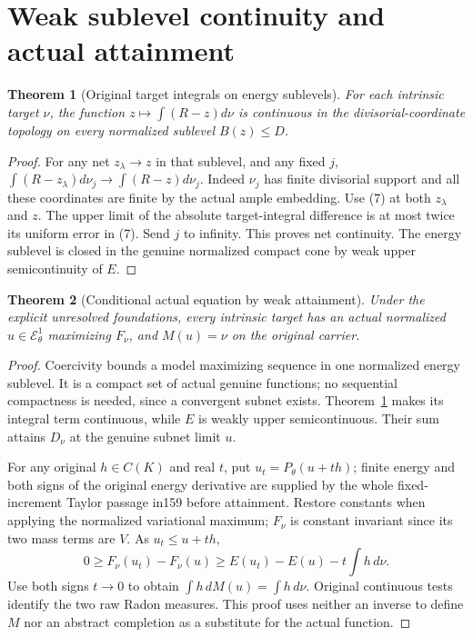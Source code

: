 \documentclass[11pt]{article}
\newtheorem{theorem}{Theorem}
\newcommand{\EE}{\mathcal E^1_\theta}
\begin{document}
\section{Weak sublevel continuity and actual attainment}
\begin{theorem}[Original target integrals on energy sublevels]\label{weak}
For each intrinsic target $\nu$, the function
$z\mapsto\int(R-z)d\nu$ is continuous in the divisorial-coordinate
topology on every normalized sublevel $B(z)\leq D$.
\end{theorem}
\begin{proof}
For any net $z_\lambda\to z$ in that sublevel, and any fixed $j$,
$\int(R-z_\lambda)d\nu_j\to\int(R-z)d\nu_j$.
Indeed $\nu_j$ has finite divisorial support and all these
coordinates are finite by the actual ample embedding.
Use (7) at both $z_\lambda$ and $z$.
The upper limit of the absolute target-integral difference
is at most twice its uniform error in (7).
Send $j$ to infinity. This proves net continuity.
The energy sublevel is closed in the genuine normalized compact
cone by weak upper semicontinuity of $E$.
\end{proof}

\begin{theorem}[Conditional actual equation by weak attainment]
Under the explicit unresolved foundations, every intrinsic target
has an actual normalized $u\in\EE$ maximizing $F_\nu$, and
$M(u)=\nu$ on the original carrier.
\end{theorem}
\begin{proof}
Coercivity bounds a model maximizing sequence in one normalized
energy sublevel. It is a compact set of actual genuine functions;
no sequential compactness is needed, since a convergent subnet exists.
Theorem~\ref{weak} makes its integral term continuous, while
$E$ is weakly upper semicontinuous.
Their sum attains $D_\nu$ at the genuine subnet limit $u$.

For any original $h\in C(K)$ and real $t$, put
$u_t=P_\theta(u+th)$; finite energy and both signs of the original
energy derivative are supplied by the whole fixed-increment
Taylor passage in159 before attainment.
Restore constants when applying the normalized variational maximum;
$F_\nu$ is constant invariant since its two mass terms are $V$.
As $u_t\leq u+th$,
\[
 0\geq F_\nu(u_t)-F_\nu(u)
 \geq E(u_t)-E(u)-t\int h\,d\nu .
\]
Use both signs $t\to0$ to obtain
$\int h\,dM(u)=\int h\,d\nu$.
Original continuous tests identify the two raw Radon measures.
This proof uses neither an inverse to define $M$ nor an abstract
completion as a substitute for the actual function.
\end{proof}
\end{document}
